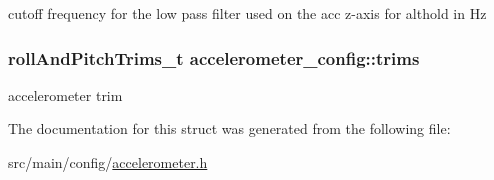 cutoff frequency for the low pass filter used on the acc z-\/axis for althold in Hz 

\hypertarget{structaccelerometer__config_a28fc946f9334d6f6e18e166e81cc6d83}{
\subsubsection[{trims}]{\setlength{\rightskip}{0pt plus 5cm}roll\+And\+Pitch\+Trims\+\_\+t accelerometer\+\_\+config\+::trims}}\label{structaccelerometer__config_a28fc946f9334d6f6e18e166e81cc6d83}


accelerometer trim 



The documentation for this struct was generated from the following file\+:\begin{DoxyCompactItemize}
\item 
src/main/config/\hyperlink{accelerometer_8h}{accelerometer.\+h}\end{DoxyCompactItemize}
